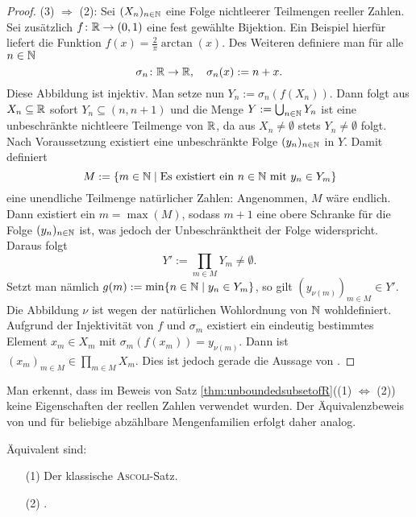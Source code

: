 \begin{proof}
  (3) $\Rightarrow$ (2):
  Sei $(X_n)_{n \in \mathbb{N}}$ eine Folge nichtleerer Teilmengen reeller Zahlen.
  Sei zusätzlich $f \colon \mathbb{R} \to (0,1)$ eine fest gewählte Bijektion.
  Ein Beispiel hierfür liefert die Funktion $f(x) = \frac{2}{\pi}\arctan(x)$.
  Des Weiteren definiere man für alle $n \in \mathbb{N}$
  \begin{displaymath}
    \sigma_n \colon \mathbb{R} \to \mathbb{R}, \quad \sigma_n(x) := n + x.
  \end{displaymath}
  Diese Abbildung ist injektiv.
  Man setze nun $Y_n := \sigma_n(f(X_n))$. 
  Dann folgt aus $X_n \subseteq \mathbb{R}$ sofort $Y_n \subseteq (n,n+1)$ und die Menge $Y:= \bigcup_{n \in \mathbb{N}} Y_n$ ist eine unbeschränkte nichtleere Teilmenge von $\mathbb{R}$, da aus $X_n \neq \emptyset$ stets $Y_n \neq \emptyset$ folgt.
  Nach Voraussetzung existiert eine unbeschränkte Folge $(y_n)_{n \in \mathbb{N}}$ in $Y$.
  Damit definiert
  \begin{displaymath}
    M := \{m \in \mathbb{N} \mid \text{Es existiert ein } n \in \mathbb{N} \text{ mit } y_n \in Y_m\}
  \end{displaymath}
  eine unendliche Teilmenge natürlicher Zahlen:
  Angenommen, $M$ wäre endlich.
  Dann existiert ein $m = \max(M)$, sodass $m + 1$ eine obere Schranke für die Folge $(y_n)_{n \in \mathbb{N}}$ ist, was jedoch der Unbeschränktheit der Folge widerspricht.
  Daraus folgt 
  \begin{displaymath}
    Y' := \prod_{m \in M} Y_m \neq \emptyset. 
  \end{displaymath}
  Setzt man nämlich $g(m) := \min\{n \in \mathbb{N} \mid y_n \in Y_m\}$, so gilt $(y_{\nu(m)})_{m \in M} \in Y'$.
  Die Abbildung $\nu$ ist wegen der natürlichen Wohlordnung von $\mathbb{N}$ wohldefiniert.
  Aufgrund der Injektivität von $f$ und $\sigma_m$ existiert ein eindeutig bestimmtes Element $x_m \in X_m$ mit $\sigma_m(f(x_m)) =   y_{\nu(m)}$.
  Dann ist $(x_m)_{m \in M} \in \prod_{m \in M} X_m$.
  Dies ist jedoch gerade die Aussage von \PCCR.
\end{proof}

\begin{bem}
  Man erkennt, dass im Beweis von Satz \ref{thm:unboundedsubsetofR}((1) $\Leftrightarrow$ (2)) keine Eigenschaften der reellen Zahlen verwendet wurden. Der Äquivalenzbeweis von \CC und \PCC für beliebige abzählbare Mengenfamilien erfolgt daher analog.
\end{bem}

\begin{thm}
  \label{thm:classicalascoli}
  Äquivalent sind:
  \begin{enumerate}
    \item[(1)] Der klassische \textsc{Ascoli}-Satz.
    \item[(2)] \CCR.
  \end{enumerate}
\end{thm}

